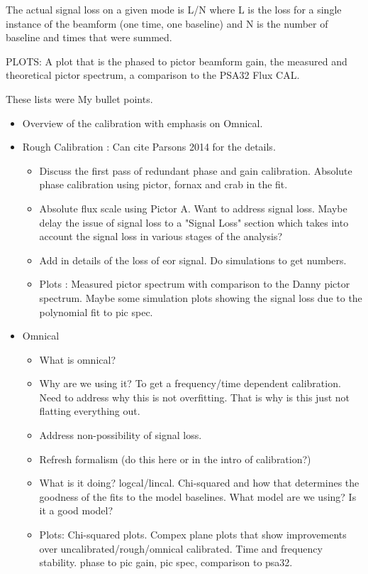 \documentclass[twocolumn,numberedappendix]{emulateapj}
\begin{document}
    The actual signal loss on a given mode is L/N where L is the loss for a
single instance of the beamform (one time, one baseline) and N is the number of
baseline and times that were summed.

    PLOTS: A plot that is the phased to pictor beamform gain, the measured and
theoretical pictor spectrum, a comparison to the PSA32 Flux CAL.

These lists were My bullet points.
\begin{itemize}
    \item{Overview of the calibration with emphasis on Omnical.}
    \item{Rough Calibration : Can cite Parsons 2014 for the details.}
    \begin{itemize}
        \item{Discuss the first pass of redundant phase and gain calibration.
              Absolute phase calibration using pictor, fornax and crab in the
              fit.}
        \item{Absolute flux scale using Pictor A. Want to address signal loss.
             Maybe delay the issue of signal loss to a "Signal Loss" section
             which takes into account the signal loss in various stages of the 
             analysis?}
        \item{Add in details of the loss of eor signal. Do simulations to get
              numbers. }
        \item{Plots : Measured pictor spectrum with comparison to the Danny
              pictor spectrum. Maybe some simulation plots showing the signal
              loss due to the polynomial fit to pic spec.}
    \end{itemize}
    \item{Omnical}
    \begin{itemize}
        \item{What is omnical?}
        \item{Why are we using it? To get a frequency/time dependent
calibration. Need to address why this is not overfitting. That is why is this
just not flatting everything out.}
        \item{Address non-possibility of signal loss.}
        \item{Refresh formalism (do this here or in the intro of calibration?)}
        \item{What is it doing? logcal/lincal. Chi-squared and how that
              determines the goodness of the fits to the model baselines. What
model are we using? Is it a good model?}
        \item{Plots: Chi-squared plots. Compex plane plots that show
              improvements over uncalibrated/rough/omnical calibrated. 
              Time and frequency stability.}
    phase to pic gain, pic spec, comparison to psa32.
    \end{itemize} 
\end{itemize}
\end{document}

